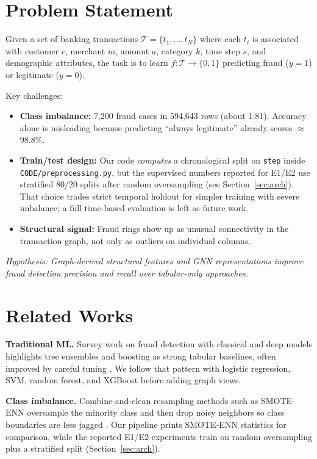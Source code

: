 \documentclass[conference]{IEEEtran}
\begin{document}
\section{Problem Statement}

Given a set of banking transactions $\mathcal{T} = \{t_1, \ldots, t_N\}$ where each $t_i$ is associated with customer $c$, merchant $m$, amount $a$, category $k$, time step $s$, and demographic attributes, the task is to learn $f: \mathcal{T} \rightarrow \{0,1\}$ predicting fraud ($y=1$) or legitimate ($y=0$).

Key challenges:
\begin{itemize}
    \item \textbf{Class imbalance:} 7,200 fraud cases in 594,643 rows (about 1:81). Accuracy alone is misleading because predicting ``always legitimate'' already scores $\approx$98.8\%.
    \item \textbf{Train/test design:} Our code \textit{computes} a chronological split on \texttt{step} inside \texttt{CODE/preprocessing.py}, but the supervised numbers reported for E1/E2 use stratified 80/20 splits after random oversampling (see Section~\ref{sec:arch}). That choice trades strict temporal holdout for simpler training with severe imbalance; a full time-based evaluation is left as future work.
    \item \textbf{Structural signal:} Fraud rings show up as unusual connectivity in the transaction graph, not only as outliers on individual columns.
\end{itemize}

\textit{Hypothesis: Graph-derived structural features and GNN representations improve fraud detection precision and recall over tabular-only approaches.}

\section{Related Works}

\textbf{Traditional ML.}
Survey work on fraud detection with classical and deep models highlights tree ensembles and boosting as strong tabular baselines, often improved by careful tuning \cite{b7}. We follow that pattern with logistic regression, SVM, random forest, and XGBoost before adding graph views.

\textbf{Class imbalance.}
Combine-and-clean resampling methods such as SMOTE-ENN oversample the minority class and then drop noisy neighbors so class boundaries are less jagged \cite{b7}. Our pipeline prints SMOTE-ENN statistics for comparison, while the reported E1/E2 experiments train on random oversampling plus a stratified split (Section~\ref{sec:arch}).
\end{document}
